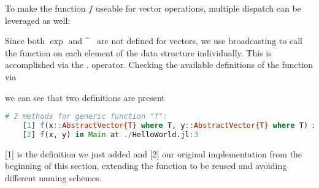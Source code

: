 To make the function $f$ useable for vector operations, multiple dispatch can be leveraged as well:



Since both $\exp$ and \^~ are not defined for vectors, we use broadcasting to call the function on each element of the data structure individually. This is accomplished via the 
. operator. Checking the available definitions of the function via 



we can see that two definitions are present

\begin{lstlisting}[language=Julia]
    # 2 methods for generic function "f":
    [1] f(x::AbstractVector{T} where T, y::AbstractVector{T} where T) in Main at ./HelloWorld.jl:32
    [2] f(x, y) in Main at ./HelloWorld.jl:3
\end{lstlisting}

[1] is the definition we just added and [2] our original implementation from the beginning of this section, extending the function to be reused and avoiding different naming schemes.

\newpage





